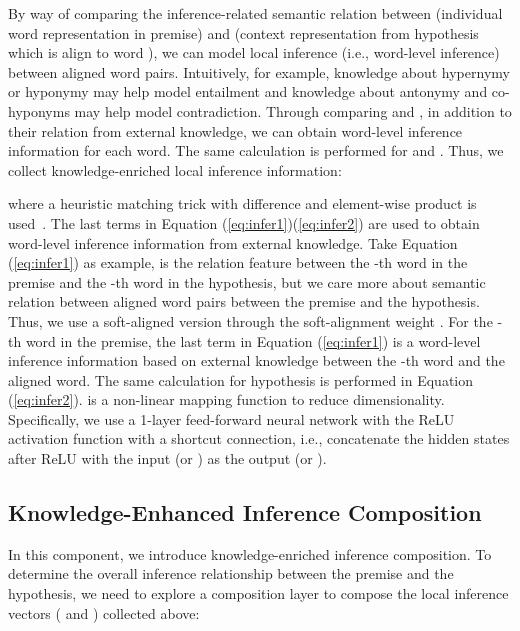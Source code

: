\documentclass[11pt,a4paper]{article}
\begin{document}
By way of comparing the inference-related semantic relation between  (individual word representation in premise) and  (context representation from hypothesis which is align to word ), we can model local inference (i.e., word-level inference) between aligned word pairs. Intuitively, for example, knowledge about hypernymy or hyponymy may help model entailment and knowledge about antonymy and co-hyponyms may help model contradiction. Through comparing  and , in addition to their relation from external knowledge, we can obtain word-level inference information for each word. The same calculation is performed for  and . Thus, we collect knowledge-enriched local inference information:
{\fontsize{10pt}{1.0cm}

}
\noindent where a heuristic matching trick with difference and element-wise product is used~\citep{DBLP:conf/acl/MouMLX0YJ16,DBLP:conf/acl/ChenZLWJI17}. 
The last terms in Equation (\ref{eq:infer1})(\ref{eq:infer2}) are used to obtain word-level inference information from external knowledge. Take Equation (\ref{eq:infer1}) as example,  is the relation feature between the -th word in the premise and the -th word in the hypothesis, but we care more about semantic relation between aligned word pairs between the premise and the hypothesis. Thus, we use a soft-aligned version through the soft-alignment weight . For the -th word in the premise, the last term in Equation (\ref{eq:infer1}) is a word-level inference information based on external knowledge between the -th word and the aligned word. The same calculation for hypothesis is performed in Equation (\ref{eq:infer2}).  is a non-linear mapping function to reduce dimensionality. Specifically, we use a 1-layer feed-forward neural network with the ReLU activation function with a shortcut connection, i.e., concatenate the hidden states after ReLU with the input  (or ) as the output  (or ).

\subsection{Knowledge-Enhanced Inference Composition}
In this component, we introduce knowledge-enriched inference composition.
To determine the overall inference relationship between the premise and the hypothesis, we need to explore a composition layer to compose the local inference vectors ( and ) collected above:
\end{document}
